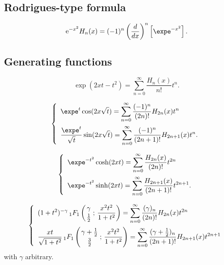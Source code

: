 \documentclass[envcountchap,graybox]{svmono}
\newcommand{\hyp}[5]{\mbox{}_{#1}{F}_{#2}
\left(\genfrac{}{}{0pt}{}{#3}{#4}\,;\,#5\right)}
\newcommand{\e}{\textrm{e}}
\begin{document}
\subsection*{Rodrigues-type formula}
\begin{equation}
\label{RodHermite}
\e^{-x^2}H_n(x)=(-1)^n\left(\frac{d}{dx}\right)^n\left[\expe^{-x^2}\right].
\end{equation}

\subsection*{Generating functions}
\begin{equation}
\label{GenHermite1}
\exp\left(2xt-t^2\right)=\sum_{n=0}^{\infty}\frac{H_n(x)}{n!}t^n.
\end{equation}

\begin{equation}
\label{GenHermite2}
\left\{\begin{array}{l}
\displaystyle\expe^t\cos(2x\sqrt{t})=\sum_{n=0}^{\infty}
\frac{(-1)^n}{(2n)!}H_{2n}(x)t^n\\[5mm]
\displaystyle\frac{\expe^t}{\sqrt{t}}\sin(2x\sqrt{t})=\sum_{n=0}^{\infty}
\frac{(-1)^n}{(2n+1)!}H_{2n+1}(x)t^n.
\end{array}\right.
\end{equation}

\begin{equation}
\label{GenHermite3}
\left\{\begin{array}{l}
\displaystyle \expe^{-t^2}\cosh(2xt)=\sum_{n=0}^{\infty}
\frac{H_{2n}(x)}{(2n)!}t^{2n}\\[5mm]
\displaystyle\expe^{-t^2}\sinh(2xt)=\sum_{n=0}^{\infty}
\frac{H_{2n+1}(x)}{(2n+1)!}t^{2n+1}.
\end{array}\right.
\end{equation}

\begin{equation}
\label{GenHermite4}
\left\{\begin{array}{l}
\displaystyle (1+t^2)^{-\gamma}\,\hyp{1}{1}{\gamma}{\frac{1}{2}}{\frac{x^2t^2}{1+t^2}}=
\sum_{n=0}^{\infty}\frac{(\gamma)_n}{(2n)!}H_{2n}(x)t^{2n}\\[5mm]
\displaystyle\frac{xt}{\sqrt{1+t^2}}\,
\hyp{1}{1}{\gamma+\frac{1}{2}}{\frac{3}{2}}{\frac{x^2t^2}{1+t^2}}
=\sum_{n=0}^{\infty}\frac{(\gamma+\frac{1}{2})_n}{(2n+1)!}H_{2n+1}(x)t^{2n+1}
\end{array}\right.
\end{equation}
with $\gamma$ arbitrary.
\end{document}
